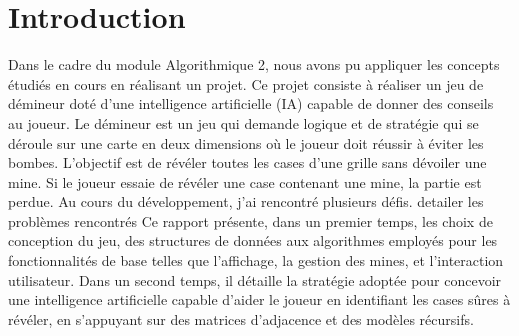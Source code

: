 \chapter{Introduction}
\label{cp:introduction}
Dans le cadre du module Algorithmique 2, nous avons pu appliquer les concepts étudiés en cours en réalisant un projet.
Ce projet consiste à réaliser un jeu de démineur doté d'une intelligence artificielle (IA) capable de donner des conseils au joueur.
Le démineur est un jeu qui demande logique et de stratégie qui se déroule sur une carte en deux dimensions où le joueur doit réussir à éviter les bombes. 
\newline\newline
L'objectif est de révéler toutes les cases d'une grille sans dévoiler une mine. Si le joueur essaie de révéler une case contenant une mine, la partie est perdue.
\newline\newline
Au cours du développement, j'ai rencontré plusieurs défis.
detailer les problèmes rencontrés
\newline\newline
Ce rapport présente, dans un premier temps, les choix de conception du jeu, des structures de données aux algorithmes employés pour les fonctionnalités de base telles que l’affichage, la gestion des mines, et l’interaction utilisateur.
\newline\newline
Dans un second temps, il détaille la stratégie adoptée pour concevoir une intelligence artificielle capable d’aider le joueur en identifiant les cases sûres à révéler, en s’appuyant sur des matrices d'adjacence et des modèles récursifs.
